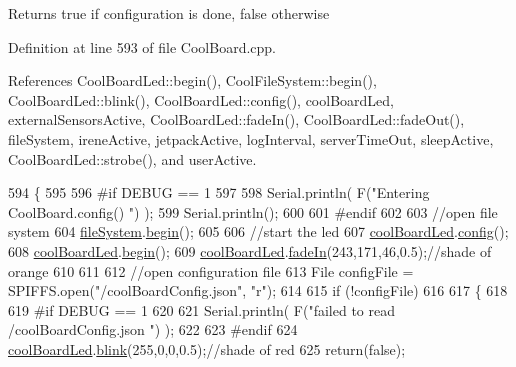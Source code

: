 \begin{DoxyReturn}{Returns}
true if configuration is done, false otherwise 
\end{DoxyReturn}


Definition at line 593 of file Cool\+Board.\+cpp.



References Cool\+Board\+Led\+::begin(), Cool\+File\+System\+::begin(), Cool\+Board\+Led\+::blink(), Cool\+Board\+Led\+::config(), cool\+Board\+Led, external\+Sensors\+Active, Cool\+Board\+Led\+::fade\+In(), Cool\+Board\+Led\+::fade\+Out(), file\+System, irene\+Active, jetpack\+Active, log\+Interval, server\+Time\+Out, sleep\+Active, Cool\+Board\+Led\+::strobe(), and user\+Active.


\begin{DoxyCode}
594 \{
595 
596 \textcolor{preprocessor}{#if DEBUG == 1}
597 
598     Serial.println( F(\textcolor{stringliteral}{"Entering CoolBoard.config() "}) );
599     Serial.println();
600 
601 \textcolor{preprocessor}{#endif}
602 
603     \textcolor{comment}{//open file system}
604     \hyperlink{classCoolBoard_a42c2586fbb13ff7f06538e9284e8538d}{fileSystem}.\hyperlink{classCoolFileSystem_a6ba6f666ed4c530174f8569d2c636748}{begin}();
605     
606     \textcolor{comment}{//start the led}
607     \hyperlink{classCoolBoard_a1b1d3c684a5baa56b08486e192fd8e97}{coolBoardLed}.\hyperlink{classCoolBoardLed_a1b60e5e30bea96c49ed62ed1bf1ffc8b}{config}();
608     \hyperlink{classCoolBoard_a1b1d3c684a5baa56b08486e192fd8e97}{coolBoardLed}.\hyperlink{classCoolBoardLed_ae3cbde8affcc6f011cbd698c8ef911f6}{begin}();
609     \hyperlink{classCoolBoard_a1b1d3c684a5baa56b08486e192fd8e97}{coolBoardLed}.\hyperlink{classCoolBoardLed_ab778f5e7bed0ab74e3906d82110493c3}{fadeIn}(243,171,46,0.5);\textcolor{comment}{//shade of orange     }
610 
611     
612     \textcolor{comment}{//open configuration file}
613     File configFile = SPIFFS.open(\textcolor{stringliteral}{"/coolBoardConfig.json"}, \textcolor{stringliteral}{"r"});
614     
615     \textcolor{keywordflow}{if} (!configFile)
616 
617     \{
618     
619 \textcolor{preprocessor}{    #if DEBUG == 1}
620 
621         Serial.println( F(\textcolor{stringliteral}{"failed to read /coolBoardConfig.json  "}) );
622 
623 \textcolor{preprocessor}{    #endif}
624         \hyperlink{classCoolBoard_a1b1d3c684a5baa56b08486e192fd8e97}{coolBoardLed}.\hyperlink{classCoolBoardLed_a96e1ea13003eee34c9dbcef340404426}{blink}(255,0,0,0.5);\textcolor{comment}{//shade of red     }
625         \textcolor{keywordflow}{return}(\textcolor{keyword}{false});

\end{DoxyCode}
